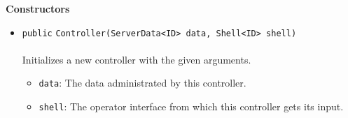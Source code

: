 \textbf{\sffamily Constructors}
\begin{itemize}
\item \lstinline|public| \lstinline|Controller|\lstinline|(ServerData<ID> data, Shell<ID> shell)|\\ \\[-0.6em]
Initializes a new controller with the given arguments.
\begin{itemize}
\item \lstinline|data|: The data administrated by this controller.
\item \lstinline|shell|: The operator interface from which this controller gets its input.
\end{itemize}



\end{itemize}


